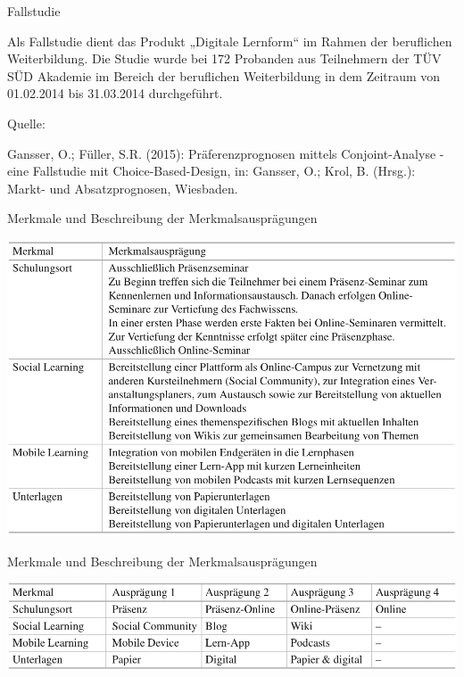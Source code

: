 \documentclass[12pt,ngerman,a4paper,ignorenonframetext,]{beamer}
\begin{document}
\begin{frame}{Fallstudie}
\protect\hypertarget{fallstudie}{}

Als Fallstudie dient das Produkt „Digitale Lernform`` im Rahmen der
beruflichen Weiterbildung. Die Studie wurde bei 172 Probanden aus
Teilnehmern der TÜV SÜD Akademie im Bereich der beruflichen
Weiterbildung in dem Zeitraum von 01.02.2014 bis 31.03.2014
durchgeführt.

Quelle:

Gansser, O.; Füller, S.\thinspace{}R. (2015): Präferenzprognosen mittels
Conjoint-Analyse - eine Fallstudie mit Choice-Based-Design, in: Gansser,
O.; Krol, B. (Hrsg.): Markt- und Absatzprognosen, Wiesbaden.

\end{frame}

\begin{frame}{Merkmale und Beschreibung der Merkmalsausprägungen}
\protect\hypertarget{merkmale-und-beschreibung-der-merkmalsauspragungen}{}

\begin{center}\includegraphics[width=0.8\linewidth]{./images/Marketingcontrolling/Merkmale} \end{center}

\end{frame}

\begin{frame}{Merkmale und Beschreibung der Merkmalsausprägungen}
\protect\hypertarget{merkmale-und-beschreibung-der-merkmalsauspragungen-1}{}

\begin{center}\includegraphics[width=0.8\linewidth]{./images/Marketingcontrolling/Kurznotation} \end{center}

\end{frame}
\end{document}
